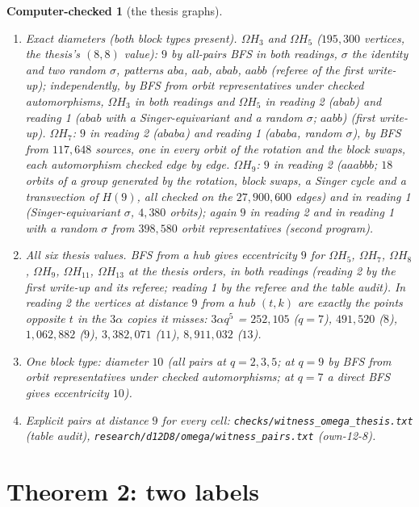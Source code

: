 \documentclass[11pt]{amsart}
\newcommand{\file}[1]{\nolinkurl{#1}}
\theoremstyle{plain}
\newtheorem{computer}{Computer-checked}
\theoremstyle{definition}
\theoremstyle{remark}
\newcommand{\Om}{\Omega}
\begin{document}
\begin{computer}[the thesis graphs]\label{cc:thesis}
\begin{enumerate}[label=(\alph*),leftmargin=1.5em]
\item \emph{Exact diameters} (both block types present). $\Om H_3$ and $\Om H_5$ ($195{,}300$ vertices, the thesis's
  $(8,8)$ value): $9$ by all-pairs BFS in both readings, $\sigma$ the identity and two random $\sigma$, patterns $aba$,
  $aab$, $abab$, $aabb$ (referee of the first write-up); independently, by BFS from orbit representatives under checked
  automorphisms, $\Om H_3$ in both readings and $\Om H_5$ in reading 2 ($abab$) and reading 1 ($abab$ with a
  Singer-equivariant and a random $\sigma$; $aabb$) (first write-up). $\Om H_7$: $9$ in reading 2 ($ababa$) and reading 1 ($ababa$, random $\sigma$), by BFS
  from $117{,}648$ sources, one in every orbit of the rotation and the block swaps, each automorphism checked edge by
  edge. $\Om H_9$: $9$ in reading 2 ($aaabbb$; $18$ orbits of a group generated by the rotation, block swaps, a Singer
  cycle and a transvection of $H(9)$, all checked on the $27{,}900{,}600$ edges) and in reading 1 (Singer-equivariant
  $\sigma$, $4{,}380$ orbits); again $9$ in reading 2 and in reading 1 with a random $\sigma$ from $398{,}580$ orbit
  representatives (second program).
\item \emph{All six thesis values.} BFS from a hub gives eccentricity $9$ for $\Om H_5$, $\Om H_7$, $\Om H_8$, $\Om H_9$,
  $\Om H_{11}$, $\Om H_{13}$ at the thesis orders, in both readings (reading 2 by the first write-up and its referee; reading 1 by the referee
  and the table audit). In reading 2
  the vertices at distance $9$ from a hub $(t,k)$ are exactly the points opposite $t$ in the $3\alpha$ copies it misses:
  $3\alpha q^5$ = $252{,}105$ ($q = 7$), $491{,}520$ ($8$), $1{,}062{,}882$ ($9$), $3{,}382{,}071$ ($11$),
  $8{,}911{,}032$ ($13$).
\item \emph{One block type}: diameter $10$ (all pairs at $q = 2, 3, 5$; at $q = 9$ by BFS from orbit
  representatives under checked automorphisms; at $q = 7$ a direct BFS gives eccentricity $10$).
\item Explicit pairs at distance $9$ for every cell: \file{checks/witness_omega_thesis.txt} (table audit),
  \file{research/d12D8/omega/witness_pairs.txt} (own-12-8).
\end{enumerate}
\end{computer}

\section{Theorem 2: two labels}\label{sec:two}
\end{document}
